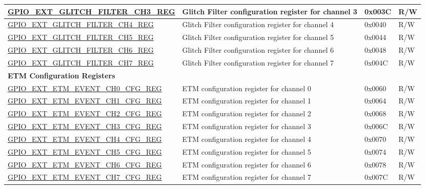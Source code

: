 \begin{longtable}{ | p{6.2cm} | p{7cm} | p{1.3cm} | p{1cm} | }
\hyperref[regdesc:GPIOSDGLITCHFILTERCHNREG]{GPIO\_EXT\_GLITCH\_FILTER\_CH3\_REG} & Glitch Filter configuration register for channel 3 & 0x003C & R/W \\ \hline
\hyperref[regdesc:GPIOSDGLITCHFILTERCHNREG]{GPIO\_EXT\_GLITCH\_FILTER\_CH4\_REG} & Glitch Filter configuration register for channel 4 & 0x0040 & R/W \\ \hline
\hyperref[regdesc:GPIOSDGLITCHFILTERCHNREG]{GPIO\_EXT\_GLITCH\_FILTER\_CH5\_REG} & Glitch Filter configuration register for channel 5 & 0x0044 & R/W \\ \hline
\hyperref[regdesc:GPIOSDGLITCHFILTERCHNREG]{GPIO\_EXT\_GLITCH\_FILTER\_CH6\_REG} & Glitch Filter configuration register for channel 6 & 0x0048 & R/W \\ \hline
\hyperref[regdesc:GPIOSDGLITCHFILTERCHNREG]{GPIO\_EXT\_GLITCH\_FILTER\_CH7\_REG} & Glitch Filter configuration register for channel 7 & 0x004C & R/W \\ \hline
\multicolumn{4}{|l|}{\textbf{ETM Configuration Registers}} \\ \hline
\hyperref[regdesc:GPIOSDETMEVENTCHNCFGREG]{GPIO\_EXT\_ETM\_EVENT\_CH0\_CFG\_REG} & ETM configuration register for channel 0 & 0x0060 & R/W \\ \hline
\hyperref[regdesc:GPIOSDETMEVENTCHNCFGREG]{GPIO\_EXT\_ETM\_EVENT\_CH1\_CFG\_REG} & ETM configuration register for channel 1 & 0x0064 & R/W \\ \hline
\hyperref[regdesc:GPIOSDETMEVENTCHNCFGREG]{GPIO\_EXT\_ETM\_EVENT\_CH2\_CFG\_REG} & ETM configuration register for channel 2 & 0x0068 & R/W \\ \hline
\hyperref[regdesc:GPIOSDETMEVENTCHNCFGREG]{GPIO\_EXT\_ETM\_EVENT\_CH3\_CFG\_REG} & ETM configuration register for channel 3 & 0x006C & R/W \\ \hline
\hyperref[regdesc:GPIOSDETMEVENTCHNCFGREG]{GPIO\_EXT\_ETM\_EVENT\_CH4\_CFG\_REG} & ETM configuration register for channel 4 & 0x0070 & R/W \\ \hline
\hyperref[regdesc:GPIOSDETMEVENTCHNCFGREG]{GPIO\_EXT\_ETM\_EVENT\_CH5\_CFG\_REG} & ETM configuration register for channel 5 & 0x0074 & R/W \\ \hline
\hyperref[regdesc:GPIOSDETMEVENTCHNCFGREG]{GPIO\_EXT\_ETM\_EVENT\_CH6\_CFG\_REG} & ETM configuration register for channel 6 & 0x0078 & R/W \\ \hline
\hyperref[regdesc:GPIOSDETMEVENTCHNCFGREG]{GPIO\_EXT\_ETM\_EVENT\_CH7\_CFG\_REG} & ETM configuration register for channel 7 & 0x007C & R/W \\ \hline

\end{longtable}
